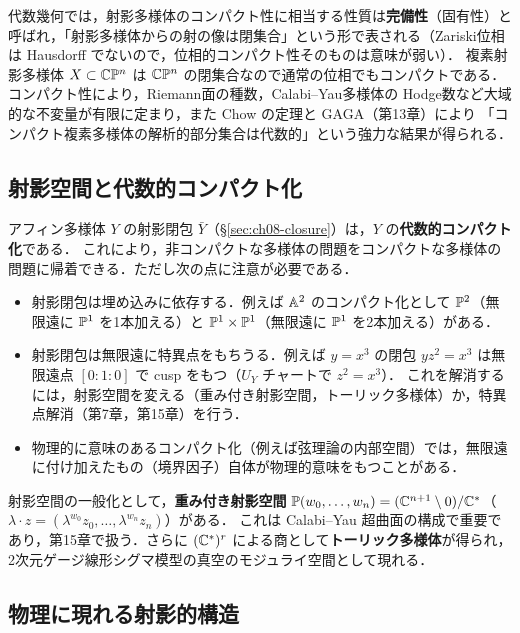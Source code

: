 代数幾何では，射影多様体のコンパクト性に相当する性質は\textbf{完備性}（固有性）と呼ばれ，「射影多様体からの射の像は閉集合」という形で表される（Zariski位相は Hausdorff でないので，位相的コンパクト性そのものは意味が弱い）．
複素射影多様体 $X\subset\mathbb{C}\mathbb{P}^n$ は $\mathbb{C}\mathbb{P}^n$ の閉集合なので通常の位相でもコンパクトである．
コンパクト性により，Riemann面の種数，Calabi–Yau多様体の Hodge数など大域的な不変量が有限に定まり，また Chow の定理と GAGA（第13章）により
「コンパクト複素多様体の解析的部分集合は代数的」という強力な結果が得られる．

\subsection{射影空間と代数的コンパクト化}

アフィン多様体 $Y$ の射影閉包 $\bar Y$（\S\ref{sec:ch08-closure}）は，$Y$ の\textbf{代数的コンパクト化}である．
これにより，非コンパクトな多様体の問題をコンパクトな多様体の問題に帰着できる．ただし次の点に注意が必要である．

\begin{itemize}
  \item 射影閉包は埋め込みに依存する．例えば $\mathbb{A}^2$ のコンパクト化として $\mathbb{P}^2$（無限遠に $\mathbb{P}^1$ を1本加える）と $\mathbb{P}^1\times\mathbb{P}^1$（無限遠に $\mathbb{P}^1$ を2本加える）がある．
  \item 射影閉包は無限遠に特異点をもちうる．例えば $y=x^3$ の閉包 $yz^2=x^3$ は無限遠点 $[0:1:0]$ で cusp をもつ（$U_Y$ チャートで $z^2=x^3$）．
  これを解消するには，射影空間を変える（重み付き射影空間，トーリック多様体）か，特異点解消（第7章，第15章）を行う．
  \item 物理的に意味のあるコンパクト化（例えば弦理論の内部空間）では，無限遠に付け加えたもの（境界因子）自体が物理的意味をもつことがある．
\end{itemize}

射影空間の一般化として，\textbf{重み付き射影空間} $\mathbb{P}(w_0,\dots,w_n)=(\mathbb{C}^{n+1}\setminus0)/\mathbb{C}^*$（$\lambda\cdot z=(\lambda^{w_0}z_0,\dots,\lambda^{w_n}z_n)$）がある．
これは Calabi–Yau 超曲面の構成で重要であり，第15章で扱う．さらに $(\mathbb{C}^*)^r$ による商として\textbf{トーリック多様体}が得られ，2次元ゲージ線形シグマ模型の真空のモジュライ空間として現れる．

\subsection{物理に現れる射影的構造}

